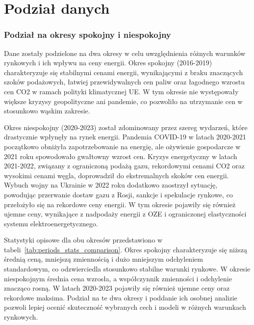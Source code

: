 \section{Podział danych}

\subsubsection{Podział na okresy spokojny i niespokojny}

Dane zostały podzielone na dwa okresy w celu uwzględnienia różnych warunków rynkowych i ich wpływu na ceny energii. Okres spokojny (2016-2019) charakteryzuje się stabilnymi cenami energii, wynikającymi z braku znaczących szoków podażowych, łatwiej przewidywalnych cen paliw oraz łagodnego wzrostu cen CO2 w ramach polityki klimatycznej UE. W tym okresie nie występowały większe kryzysy geopolityczne ani pandemie, co pozwoliło na utrzymanie cen w stosunkowo wąskim zakresie.

Okres niespokojny (2020-2023) został zdominowany przez szereg wydarzeń, które drastycznie wpłynęły na rynek energii. Pandemia COVID-19 w latach 2020-2021 początkowo obniżyła zapotrzebowanie na energię, ale ożywienie gospodarcze w 2021 roku spowodowało gwałtowny wzrost cen. Kryzys energetyczny w latach 2021-2022, związany z ograniczoną podażą gazu, rekordowymi cenami CO2 oraz wysokimi cenami węgla, doprowadził do ekstremalnych skoków cen energii. Wybuch wojny na Ukrainie w 2022 roku dodatkowo zaostrzył sytuację, powodując przerwanie dostaw gazu z Rosji, sankcje i spekulacje rynkowe, co przełożyło się na rekordowe ceny energii. W tym okresie pojawiły się również ujemne ceny, wynikające z nadpodaży energii z OZE i ograniczonej elastyczności systemu elektroenergetycznego.

Statystyki opisowe dla obu okresów przedstawiono w tabeli~\ref{tab:periods_stats_comparison}. Okres spokojny charakteryzuje się niższą średnią ceną, mniejszą zmiennością i dużo mniejszym odchyleniem standardowym, co odzwierciedla stosunkowo stabilne warunki rynkowe. W okresie niespokojnym średnia cena wzrosła, a współczynnik zmienności i odchylenie znacząco rosną. W latach 2020-2023 pojawiły się również ujemne ceny oraz rekordowe maksima. Podział na te dwa okresy i poddanie ich osobnej analizie pozwoli lepiej ocenić skuteczność wybranych cech i modeli w różnych warunkach rynkowych.

